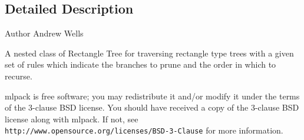 \subsection{Detailed Description}
\begin{DoxyAuthor}{Author}
Andrew Wells
\end{DoxyAuthor}
A nested class of Rectangle Tree for traversing rectangle type trees with a given set of rules which indicate the branches to prune and the order in which to recurse.

mlpack is free software; you may redistribute it and/or modify it under the terms of the 3-\/clause B\+SD license. You should have received a copy of the 3-\/clause B\+SD license along with mlpack. If not, see {\tt http\+://www.\+opensource.\+org/licenses/\+B\+S\+D-\/3-\/\+Clause} for more information. 